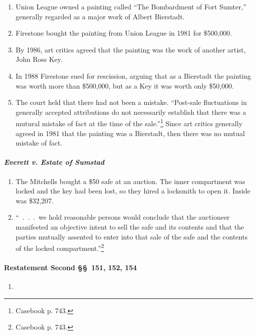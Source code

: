 \begin{enumerate}
    \item Union League owned a painting called ``The Bombardment of Fort 
    Sumter,'' generally regarded as a major work of Albert Bierstadt.
    \item Firestone bought the painting from Union League in 1981 for 
    \$500,000.
    \item By 1986, art critics agreed that the painting was the work of 
    another artist, John Ross Key.
    \item In 1988 Firestone sued for rescission, arguing that as a Bierstadt 
    the painting was worth more than \$500,000, but as a Key it was worth only 
    \$50,000.
    \item The court held that there had not been a mistake. ``Post-sale 
    fluctuations in generally accepted attributions do not necessarily 
    establish that there was a mutural mistake of fact at the time of the 
    sale.''\footnote{Casebook p. 743.} Since art critics generally agreed in 
    1981 that the painting was a Bierstadt, then there was no mutual mistake 
    of fact.
\end{enumerate}

\paragraph{\emph{Everett v. Estate of Sumstad}}

\begin{enumerate}
    \item The Mitchells bought a \$50 safe at an auction. The inner 
    compartment was locked and the key had been lost, so they hired a 
    locksmith to open it. Inside was \$32,207.
    \item ``~.~.~.~we hold reasonable persons would conclude that the 
    auctioneer manifested an objective intent to sell the safe and its 
    contents and that the parties mutually assented to enter into that sale of 
    the safe and the contents of the locked compartment.''\footnote{Casebook 
    p. 743.}
\end{enumerate}

\paragraph{Restatement Second \S\S\ 151, 152, 154}

\begin{enumerate}
    \item %
\end{enumerate}

